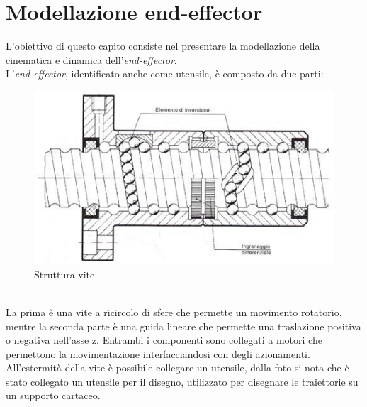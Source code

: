 \section{Modellazione end-effector}\label{DescrizioneEF}
L'obiettivo di questo capito consiste nel presentare la modellazione della cinematica e dinamica dell'\textit{end-effector}.
\\L'\textit{end-effector}, identificato anche come utensile, è composto da due parti: 
\begin{figure}[ht]
	\begin{center}
		\includegraphics[scale=0.5]{Immagini/ViteRicircolo}
		\caption{Struttura vite}
	\end{center}
\end{figure}
\\La prima è una vite a ricircolo di sfere che permette un movimento rotatorio, mentre la seconda parte è una guida lineare che permette una traslazione positiva o negativa nell'asse z. Entrambi i componenti sono collegati a motori che permettono la movimentazione interfacciandosi con degli azionamenti. All'estermità della vite è possibile collegare un utensile, dalla foto si nota che è stato collegato un utensile per il disegno, utilizzato per disegnare le traiettorie su un supporto cartaceo.
